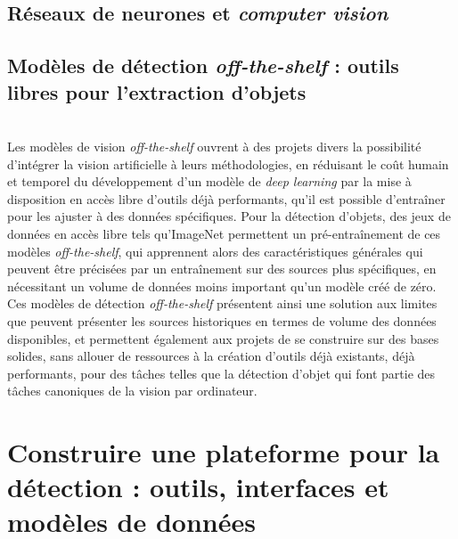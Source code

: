\documentclass[a4paper,12pt,twoside]{book}
\newcommand{\clearemptydoublepage}{\newpage{\pagestyle{empty}\cleardoublepage}}
\begin{document}
                \section{Réseaux de neurones et \textit{computer vision}}
                    
            
                \section[Modèles de vision \textit{off-the-shelf}]{Modèles de détection \textit{off-the-shelf} : outils libres pour l'extraction d’objets}
                    
        \\
		
		Les modèles de vision \textit{off-the-shelf} ouvrent à des projets divers la possibilité d'intégrer la vision artificielle à leurs méthodologies, en réduisant le coût humain et temporel du développement d'un modèle de \textit{deep learning} par la mise à disposition en accès libre d'outils déjà performants, qu'il est possible d'entraîner pour les ajuster à des données spécifiques. Pour la détection d'objets, des jeux de données en accès libre tels qu'ImageNet permettent un pré-entraînement de ces modèles \textit{off-the-shelf}, qui apprennent alors des caractéristiques générales qui peuvent être précisées par un entraînement sur des sources plus spécifiques, en nécessitant un volume de données moins important qu'un modèle créé de zéro. Ces modèles de détection \textit{off-the-shelf} présentent ainsi une solution aux limites que peuvent présenter les sources historiques en termes de volume des données disponibles, et permettent également aux projets de se construire sur des bases solides, sans allouer de ressources à la création d'outils déjà existants, déjà performants, pour des tâches telles que la détection d'objet qui font partie des tâches canoniques de la vision par ordinateur.
        \clearemptydoublepage
        
        \chapter[Construire une plateforme pour la détection]{Construire une plateforme pour la détection : outils, interfaces et modèles de données}
        
\end{document}

